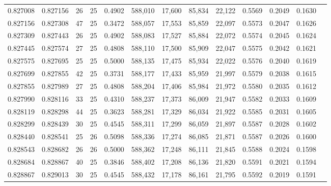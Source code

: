 \begin{tabular}{rrrrrrrrrrrrr}
0.827008 & 0.827156 &    26 &  25 &                                     0.4902 & 588,010 &  17,600 &  85,834 &  22,122 & 0.5569 & 0.2049 & 0.1630 \\
0.827156 & 0.827308 &    47 &  25 &                                     0.3472 & 588,057 &  17,553 &  85,859 &  22,097 & 0.5573 & 0.2047 & 0.1626 \\
0.827309 & 0.827443 &    26 &  25 &                                     0.4902 & 588,083 &  17,527 &  85,884 &  22,072 & 0.5574 & 0.2045 & 0.1624 \\
0.827445 & 0.827574 &    27 &  25 &                                     0.4808 & 588,110 &  17,500 &  85,909 &  22,047 & 0.5575 & 0.2042 & 0.1621 \\
0.827575 & 0.827695 &    25 &  25 &                                     0.5000 & 588,135 &  17,475 &  85,934 &  22,022 & 0.5576 & 0.2040 & 0.1619 \\
0.827699 & 0.827855 &    42 &  25 &                                     0.3731 & 588,177 &  17,433 &  85,959 &  21,997 & 0.5579 & 0.2038 & 0.1615 \\
0.827855 & 0.827989 &    27 &  25 &                                     0.4808 & 588,204 &  17,406 &  85,984 &  21,972 & 0.5580 & 0.2035 & 0.1612 \\
0.827990 & 0.828116 &    33 &  25 &                                     0.4310 & 588,237 &  17,373 &  86,009 &  21,947 & 0.5582 & 0.2033 & 0.1609 \\
0.828119 & 0.828298 &    44 &  25 &                                     0.3623 & 588,281 &  17,329 &  86,034 &  21,922 & 0.5585 & 0.2031 & 0.1605 \\
0.828299 & 0.828439 &    30 &  25 &                                     0.4545 & 588,311 &  17,299 &  86,059 &  21,897 & 0.5587 & 0.2028 & 0.1602 \\
0.828440 & 0.828541 &    25 &  26 &                                     0.5098 & 588,336 &  17,274 &  86,085 &  21,871 & 0.5587 & 0.2026 & 0.1600 \\
0.828543 & 0.828682 &    26 &  26 &                                     0.5000 & 588,362 &  17,248 &  86,111 &  21,845 & 0.5588 & 0.2024 & 0.1598 \\
0.828684 & 0.828867 &    40 &  25 &                                     0.3846 & 588,402 &  17,208 &  86,136 &  21,820 & 0.5591 & 0.2021 & 0.1594 \\
0.828867 & 0.829013 &    30 &  25 &                                     0.4545 & 588,432 &  17,178 &  86,161 &  21,795 & 0.5592 & 0.2019 & 0.1591 \\

\end{tabular}

